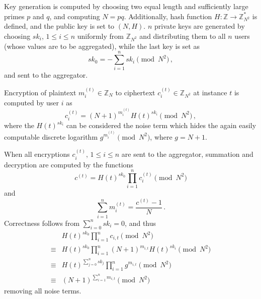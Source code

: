 \documentclass[10pt,journal,compsoc]{IEEEtran}
\theoremstyle{definition}
\theoremstyle{definition}
\theoremstyle{remark}
\begin{document}
Key generation is computed by choosing two equal length and sufficiently large primes $p$ and $q$, and computing $N=pq$. Additionally, hash function $H:\mathbb{Z} \rightarrow \mathbb{Z}_{N^2}^*$ is defined, and the public key is set to $(N, H)$. $n$ private keys are generated by choosing $sk_i,\,1\leq i\leq n$ uniformly from $\mathbb{Z}_{N^2}$ and distributing them to all $n$ users (whose values are to be aggregated), while the last key is set as
\begin{equation}
    sk_0 = -\sum^{n}_{i=1}sk_i \pmod{N^2}\,,
\end{equation}
and sent to the aggregator.

Encryption of plaintext $m^{(t)}_{i} \in \mathbb{Z}_N$ to ciphertext $c^{(t)}_{i} \in \mathbb{Z}_{N^2}$ at instance $t$ is computed by user $i$ as
\begin{equation}
    c^{(t)}_{i} = (N+1)^{m^{(t)}_{i}} H(t)^{sk_i} \pmod{N^2}\,,
\end{equation}
where the $H(t)^{sk_i}$ can be considered the noise term which hides the again easily computable discrete logarithm $g^{m^{(t)}_{i}} \pmod{N^2}$, where $g=N+1$.

When all encryptions $c^{(t)}_{i},\,1\leq i \leq n$ are sent to the aggregator, summation and decryption are computed by the functions
\begin{equation}
    c^{(t)} = H(t)^{sk_0}\prod^{n}_{i=1}c^{(t)}_{i} \pmod{N^2}
\end{equation}
and
\begin{equation}
    \sum^{n}_{i=1}m^{(t)}_{i} = \frac{c^{(t)}-1}{N}\,. \label{eqn:agg_decryption}
\end{equation}
Correctness follows from $\sum^{n}_{i=0}sk_i = 0$, and thus
\begin{equation*}
    \begin{split}
        &H(t)^{sk_0}\prod^{n}_{i=1}c_{i,t} \pmod{N^2} \\
        \equiv &H(t)^{sk_0}\prod^{n}_{i=1}(N+1)^{m_{i,t}} H(t)^{sk_i} \pmod{N^2} \\
        \equiv &H(t)^{\sum^n_{j=0}sk_j} \prod^{n}_{i=1}g^{m_{i,t}} \pmod{N^2} \\
        \equiv &(N+1)^{\sum^n_{i=1}m_{i,t}} \pmod{N^2}
    \end{split}
\end{equation*}
removing all noise terms.
\end{document}
